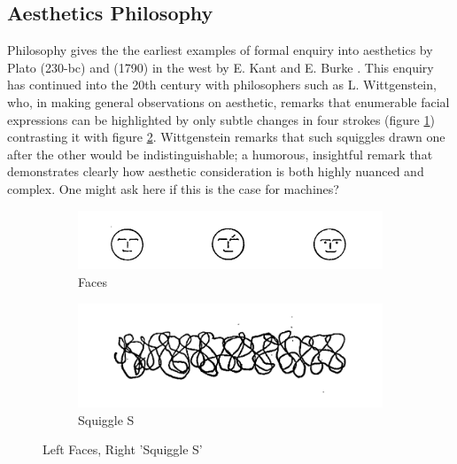 \subsection{Aesthetics Philosophy}

Philosophy gives the the earliest examples of formal enquiry into aesthetics by Plato\cite{Plochmann1976} (230-bc) and (1790)  in the west by E. Kant and E. Burke \cite{Kant1892kant, Burke1773philosophical}. This enquiry has continued into the 20th century with philosophers such as L. Wittgenstein\cite{Wittgenstien1967}, who, in making general observations on aesthetic, remarks that enumerable facial expressions can be highlighted by only subtle changes in four strokes (figure \ref{fig:faces})  contrasting it with figure \ref{fig:squiggle}. Wittgenstein remarks that such squiggles drawn one after the other would be indistinguishable; a humorous, insightful remark that demonstrates clearly how aesthetic consideration is both highly nuanced and complex. One might ask here if this is the case for machines? 
\begin{figure}[H]
    \centering
    \begin{subfigure}[b]{0.3\textwidth}
    \centering
    \includegraphics[width=\textwidth]{figures/introduction/faces.png}
    \caption{Faces}
    \label{fig:faces}
    \end{subfigure}
    \begin{subfigure}[b]{0.3\textwidth}
    \centering
    \includegraphics[width=\textwidth]{figures/introduction/squiggle_s.png}
    \caption{Squiggle S}
    \label{fig:squiggle}
    \end{subfigure}
    \caption{Left Faces, Right 'Squiggle S' \cite{Wittgenstien1967} }
    \label{fig:Witgenstein}
\end{figure}


